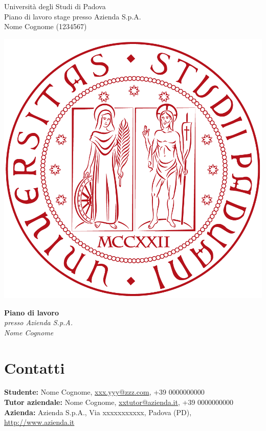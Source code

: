 \documentclass[11pt,notitlepage]{article}
\makeatletter
\newcommand{\nomeStudente}{Nome}
\newcommand{\cognomeStudente}{Cognome}
\newcommand{\matricolaStudente}{1234567}
\newcommand{\emailStudente}{xxx.yyy@zzz.com}
\newcommand{\telStudente}{+39 0000000000}
\newcommand{\nomeTutorAziendale}{Nome}
\newcommand{\cognomeTutorAziendale}{Cognome}
\newcommand{\emailTutorAziendale}{xxtutor@azienda.it}
\newcommand{\telTutorAziendale}{+39 0000000000}
\newcommand{\ragioneSocAzienda}{Azienda S.p.A.}
\newcommand{\indirizzoAzienda}{Via xxxxxxxxxxx, Padova (PD)}
\newcommand{\sitoAzienda}{http://www.azienda.it}
\makeatother
\begin{document}
	
\noindent
\parbox{0.7\columnwidth}{Università degli Studi di Padova\\
	Piano di lavoro stage presso \ragioneSocAzienda{}\\
	\nomeStudente{} \cognomeStudente{} (\matricolaStudente{})}%
\parbox{0.3\columnwidth}{
	\hfill \includegraphics[scale=0.08]{immagini/logo-unipd.png}}

\bigskip
\begin{center}
{\Huge \textbf{Piano di lavoro}} \\ \bigskip
	{\Large \textit{presso \ragioneSocAzienda{}}}\\ \bigskip
	{\Large \textit{\nomeStudente{} \cognomeStudente{}}}
\end{center}

\section*{Contatti}
\textbf{Studente:} \nomeStudente{} \cognomeStudente{}, \href{mailto:\emailStudente{}}{\emailStudente{}}, \telStudente{} \\
\textbf{Tutor aziendale:} \nomeTutorAziendale{} \cognomeTutorAziendale{}, \href{mailto:\emailTutorAziendale{}}{\emailTutorAziendale{}}, \telTutorAziendale{} \\
\textbf{Azienda:} \ragioneSocAzienda{}, \indirizzoAzienda{}, \href{\sitoAzienda{}}{\sitoAzienda{}}
\end{document}
